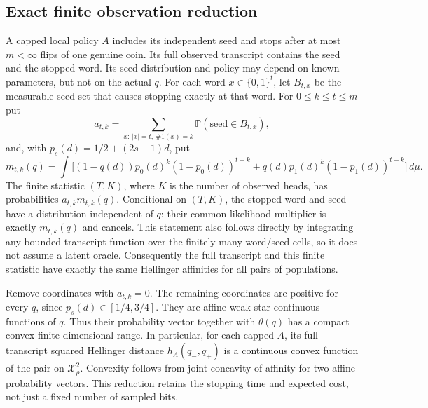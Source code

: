 \documentclass[11pt]{article}
\newcommand{\Pp}{\mathbb P}
\begin{document}
\subsection*{Exact finite observation reduction}
A capped local policy $A$ includes its independent seed and stops after at
most $m<\infty$ flips of one genuine coin. Its full observed transcript
contains the seed and the stopped word. Its seed distribution and policy
may depend on known parameters, but not on the actual $q$.
For each word $x\in\{0,1\}^t$, let $B_{t,x}$ be the measurable seed set
that causes stopping exactly at that word. For $0\le k\le t\le m$ put
\[
 a_{t,k}=\sum_{x:\,|x|=t,\,\#1(x)=k}\Pp(\text{seed}\in B_{t,x}),
\]
and, with $p_s(d)=1/2+(2s-1)d$, put
\[
 m_{t,k}(q)=\int\big[(1-q(d))p_0(d)^k(1-p_0(d))^{t-k}
                  +q(d)p_1(d)^k(1-p_1(d))^{t-k}\big]\,d\mu.
\]
The finite statistic $(T,K)$, where $K$ is the number of observed heads,
has probabilities $a_{t,k}m_{t,k}(q)$. Conditional on $(T,K)$, the stopped
word and seed have a distribution independent of $q$: their common
likelihood multiplier is exactly $m_{t,k}(q)$ and cancels. This statement
also follows directly by integrating any bounded transcript function over
the finitely many word/seed cells, so it does not assume a latent oracle.
Consequently the full transcript and this finite statistic have exactly
the same Hellinger affinities for all pairs of populations.

Remove coordinates with $a_{t,k}=0$. The remaining coordinates are positive
for every $q$, since $p_s(d)\in[1/4,3/4]$. They are affine weak-star
continuous functions of $q$. Thus their probability vector together with
$\theta(q)$ has a compact convex finite-dimensional range. In particular,
for each capped $A$, its full-transcript squared Hellinger distance
$h_A(q_-,q_+)$ is a continuous convex function of the pair on
$\mathcal X_\rho^2$. Convexity follows from joint concavity of affinity for
two affine probability vectors. This reduction retains the stopping time
and expected cost, not just a fixed number of sampled bits.
\end{document}
